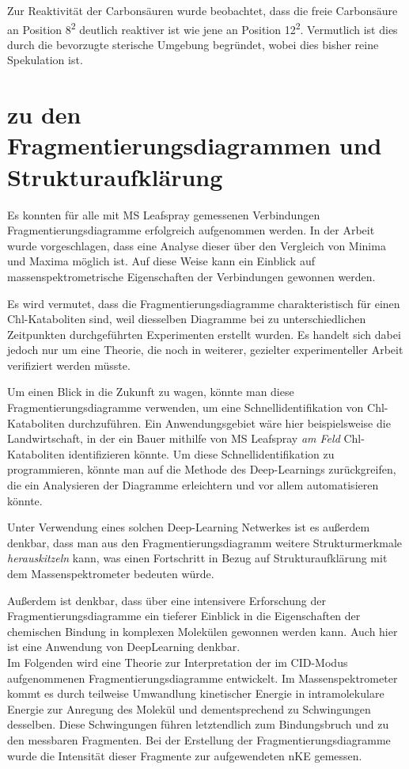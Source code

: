 Zur Reaktivität der Carbonsäuren wurde beobachtet, dass die freie Carbonsäure an Position 8\textsuperscript{2} deutlich reaktiver ist wie jene an Position 12\textsuperscript{2}. Vermutlich ist dies durch die bevorzugte sterische Umgebung begründet, wobei dies bisher reine Spekulation ist.

\section{zu den Fragmentierungsdiagrammen und Strukturaufklärung}

Es konnten für alle mit MS Leafspray gemessenen Verbindungen Fragmentierungsdiagramme erfolgreich aufgenommen werden. In der Arbeit wurde vorgeschlagen, dass eine Analyse dieser über den Vergleich von Minima und Maxima möglich ist. Auf diese Weise kann ein Einblick auf massenspektrometrische Eigenschaften der Verbindungen gewonnen werden. 

Es wird vermutet, dass die Fragmentierungsdiagramme charakteristisch für einen Chl-Kataboliten sind, weil diesselben Diagramme bei zu unterschiedlichen Zeitpunkten durchgeführten Experimenten erstellt wurden. Es handelt sich dabei jedoch nur um eine Theorie, die noch in weiterer, gezielter experimenteller Arbeit verifiziert werden müsste.

Um einen Blick in die Zukunft zu wagen, könnte man diese Fragmentierungsdiagramme verwenden, um eine Schnellidentifikation von Chl-Kataboliten durchzuführen. Ein Anwendungsgebiet wäre hier beispielsweise die Landwirtschaft, in der ein Bauer mithilfe von MS Leafspray \textit{am Feld} Chl-Kataboliten identifizieren könnte. Um diese Schnellidentifikation zu programmieren, könnte man auf die Methode des Deep-Learnings zurückgreifen, die ein Analysieren der Diagramme erleichtern und vor allem automatisieren könnte. 

Unter Verwendung eines solchen Deep-Learning Netwerkes ist es außerdem denkbar, dass man aus den Fragmentierungsdiagramm weitere Strukturmerkmale \textit{herauskitzeln} kann, was einen Fortschritt in Bezug auf Strukturaufklärung mit dem Massenspektrometer bedeuten würde.

Außerdem ist denkbar, dass über eine intensivere Erforschung der Fragmentierungsdiagramme ein tieferer Einblick in die Eigenschaften der chemischen Bindung in komplexen Molekülen gewonnen werden kann. Auch hier ist eine Anwendung von DeepLearning denkbar.\\

Im Folgenden wird eine Theorie zur Interpretation der im CID-Modus aufgenommenen Fragmentierungsdiagramme entwickelt. Im Massenspektrometer kommt es durch teilweise Umwandlung kinetischer Energie in intramolekulare Energie zur  Anregung des Molekül und dementsprechend zu Schwingungen desselben. Diese Schwingungen führen letztendlich zum Bindungsbruch und zu den messbaren Fragmenten. Bei der Erstellung der Fragmentierungsdiagramme wurde die Intensität dieser Fragmente zur aufgewendeten \gls{nKE} gemessen. \\

